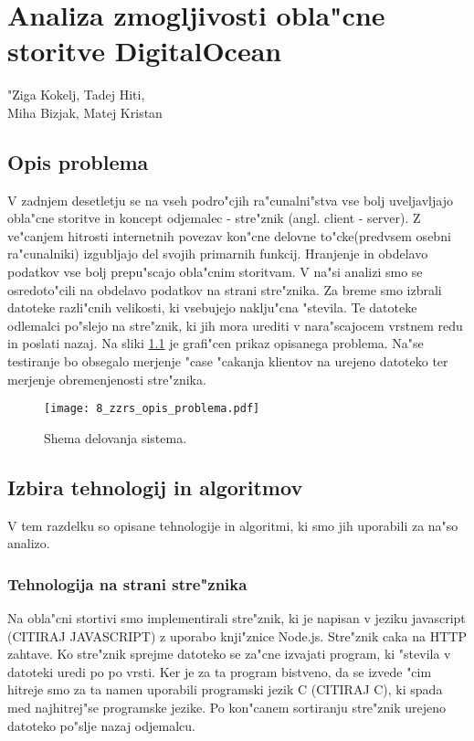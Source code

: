 \chapter[Analiza zmogljivosti obla"cne storitve DigitalOcean]{Analiza zmogljivosti obla"cne storitve DigitalOcean}

\pagestyle{fancy}
\fancyhf{}
\fancyhead[LE,RO]{\thepage}
\fancyhead[RE,LO]{\leftmark}

\huge "Ziga Kokelj, Tadej Hiti,\\Miha Bizjak, Matej Kristan
\normalsize
\bigskip

\section{Opis problema} \label{8_opis_problema}
\noindent V zadnjem desetletju se na vseh podro"cjih ra"cunalni"stva vse bolj uveljavljajo obla"cne storitve in koncept odjemalec - stre"znik (angl. client - server). Z ve"canjem hitrosti internetnih povezav kon"cne delovne to"cke(predvsem osebni ra"cunalniki) izgubljajo del svojih primarnih funkcij. Hranjenje in obdelavo podatkov vse bolj prepu"scajo obla"cnim storitvam. V na"si analizi smo se osredoto"cili na obdelavo podatkov na strani stre"znika. Za breme smo izbrali datoteke razli"cnih velikosti, ki vsebujejo naklju"cna "stevila. Te datoteke odlemalci po"slejo na stre"znik, ki jih mora urediti v nara"scajocem vrstnem redu in poslati nazaj.  Na sliki \ref{8_opis_problema} je grafi"cen prikaz opisanega problema. Na"se testiranje bo obsegalo merjenje  "case "cakanja  klientov na urejeno datoteko ter merjenje obremenjenosti stre"znika. 

\begin{figure}
  \centering
    \texttt{[image: 8\_zzrs\_opis\_problema.pdf]}
  \caption{Shema delovanja sistema.}
  \label{8_opis_problema}
\end{figure}


\section{Izbira tehnologij in algoritmov}
V tem razdelku so opisane tehnologije in algoritmi, ki smo jih uporabili za na"so analizo.


\subsection{Tehnologija na strani stre"znika }
Na obla"cni stortivi smo implementirali stre"znik, ki je napisan v jeziku javascript (CITIRAJ JAVASCRIPT) z uporabo knji"znice Node.js. Stre"znik caka na HTTP zahtave. Ko stre"znik sprejme datoteko se za"cne izvajati program, ki "stevila v datoteki uredi po po vrsti. Ker je za ta program bistveno, da se izvede "cim hitreje smo za ta namen uporabili programski jezik C (CITIRAJ C), ki spada med najhitrej"se programske jezike. Po kon"canem sortiranju stre"znik urejeno datoteko po"slje nazaj odjemalcu. 

